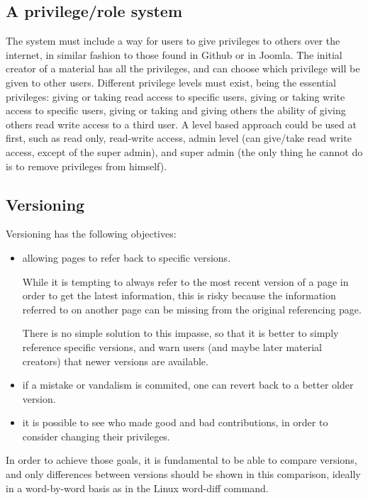 \documentclass[12pt]{article}
\begin{document}
\subsection{A privilege/role system}

The system must include a way for users to give privileges to others over the internet, in similar fashion to those found in Github or in Joomla. The initial creator of a material has all the privileges, and can choose which privilege will be given to other users. Different privilege levels must exist, being the essential privileges: giving or taking read access to specific users, giving or taking write access to specific users, giving or taking and giving others the ability of giving others read write access to a third user. A level based approach could be used at first, such as read only, read-write access, admin level (can give/take read write access, except of the super admin), and super admin (the only thing he cannot do is to remove privileges from himself).
  
\subsection{Versioning}

Versioning has the following objectives:

\begin{itemize}
  \item allowing pages to refer back to specific versions.
  
  While it is tempting to always refer to the most recent version of a page in order to get the latest information, this is risky because the information referred to on another page can be missing from the original referencing page.
  
  There is no simple solution to this impasse, so that it is better to simply reference specific versions, and warn users (and maybe later material creators) that newer versions are available.
  
  \item if a mistake or vandalism is commited, one can revert back to a better older version.
  
  \item it is possible to see who made good and bad contributions, in order to consider changing their privileges.
\end{itemize}

In order to achieve those goals, it is fundamental to be able to compare versions, and only differences between versions should be shown in this comparison, ideally in a word-by-word basis as in the Linux word-diff command.
  
\end{document}
